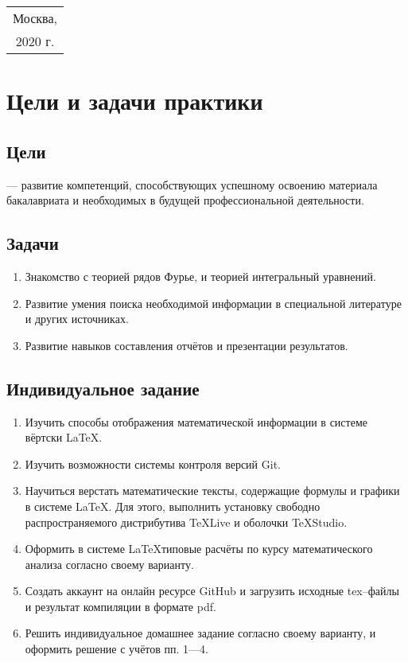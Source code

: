 \documentclass[12pt,a4paper]{article}
\begin{document}
			\vfill
			
			\begin{center}
				\large
				\begin{tabular} {c}
					Москва, \\
					2020 г.
				\end{tabular}
			\end{center}
			
			
			\newpage	
			\tableofcontents
			
			\newpage
			\section{Цели и задачи практики}	
			\subsection{Цели}
			--- развитие компетенций, способствующих успешному освоению материала бакалавриата и необходимых в будущей профессиональной деятельности.
			
			\subsection{Задачи}
			\begin{enumerate}
				\item Знакомство с теорией рядов Фурье, и теорией интегральный уравнений.
				\item Развитие умения поиска необходимой информации в специальной литературе и других источниках.
				\item Развитие навыков составления отчётов и презентации результатов.
			\end{enumerate}
			
			\subsection{Индивидуальное задание}	
			\begin{enumerate}
				\item Изучить способы отображения математической информации в системе вёртски \LaTeX.
				\item Изучить возможности  системы контроля версий \textsf{Git}.
				\item Научиться верстать математические тексты, содержащие формулы и графики в системе \LaTeX.
				Для этого, выполнить установку свободно распространяемого дистрибутива \textsf{TeXLive} и оболочки \textsf{TeXStudio}.
				\item Оформить в системе \LaTeX типовые расчёты по курсу математического анализа согласно своему варианту.
				\item Создать аккаунт на онлайн ресурсе \textsf{GitHub} и загрузить исходные \textsf{tex}--файлы 
				и результат компиляции в формате \textsf{pdf}.
				\item Решить индивидуальное домашнее задание согласно своему варианту, и оформить решение с учётов пп. 1---4.
			\end{enumerate} 
			
\end{document}
